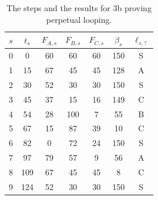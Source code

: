             \begin{table}[h]
                \centering
                \label{tab:exercise3b}
                \begin{tabular}{cc|ccccc}
                    \textbf{$s$} & \textbf{$t_s$} & \textbf{$F_{A,s}$} &
                    \textbf{$F_{B,s}$} & \textbf{$F_{C,s}$} & \textbf{$\beta_s$} &
                    \textbf{$\ell_{s,?}$} \\
                    \hline
                    0 & 0   & 60 & 60  & 60 & 150 & S \\
                    1 & 15  & 67 & 45  & 45 & 128 & A \\ \rowcolor{gray!15}
                    2 & 30  & 52 & 30  & 30 & 150 & S \\
                    3 & 45  & 37 & 15  & 16 & 149 & C \\
                    4 & 54  & 28 & 100 & 7  & 55  & B \\
                    5 & 67  & 15 & 87  & 39 & 10  & C \\
                    6 & 82  & 0  & 72  & 24 & 150 & S \\
                    7 & 97  & 79 & 57  & 9  & 56  & A \\
                    8 & 109 & 67 & 45  & 45 & 8   & C \\ \rowcolor{gray!15}
                    9 & 124 & 52 & 30  & 30 & 150 & S \\
                \end{tabular}
                \caption{The steps and the results for 3b proving perpetual looping.}
            \end{table}
